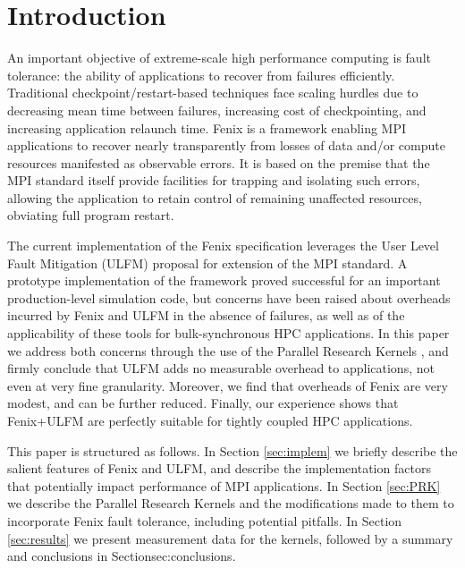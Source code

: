 \section{Introduction}
An important objective of extreme-scale high performance computing is fault tolerance:
the ability of applications to recover from failures efficiently.
Traditional checkpoint/restart-based techniques face scaling hurdles due to decreasing
mean time between failures, increasing cost of checkpointing, and 
increasing application relaunch time.
Fenix is a framework enabling MPI applications to recover nearly transparently from 
losses of data and/or compute resources manifested as observable errors.
It is based on the premise that the MPI standard itself provide facilities for trapping
and isolating such errors, allowing the application to retain control of remaining unaffected
resources, obviating full program restart.

The current implementation of the Fenix specification \cite{fenixspec} leverages
the  User Level Fault Mitigation (ULFM) \cite{bland2013post} proposal for extension
of the MPI standard.
A prototype implementation of the framework \cite{Gamell:2014} proved successful for
an important production-level simulation code, but concerns have been raised about
overheads incurred by Fenix and ULFM in the absence of failures, as well as of the
applicability of these tools for bulk-synchronous HPC applications.
In this paper we address both concerns through the use of the Parallel Research Kernels
\cite{van2016comparing}, and firmly conclude that ULFM adds no measurable
overhead to applications, not even at very fine granularity.
Moreover, we find that overheads of Fenix are very modest, and can be further reduced.
Finally, our experience shows that Fenix+ULFM are perfectly suitable for tightly coupled
HPC applications.

This paper is structured as follows.
In Section \ref{sec:implem} we briefly describe the salient features of Fenix and ULFM,
and describe the implementation factors that potentially impact performance of MPI applications.
In Section \ref{sec:PRK} we describe the Parallel Research Kernels and the modifications
made to them to incorporate Fenix fault tolerance, including potential pitfalls.
In Section \ref{sec:results} we present measurement data for the kernels,
followed by a summary and conclusions in Section{sec:conclusions}.
